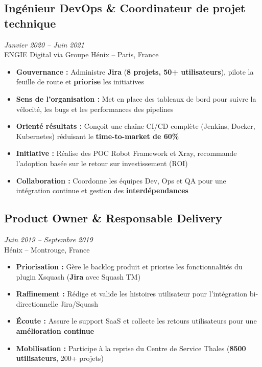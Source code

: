 \documentclass[11pt,a4paper]{article}
\newcommand{\highlight}[1]{\textcolor{primaryblue}{\textbf{#1}}}
\newcommand{\keypoint}[1]{\textbf{#1}}
\begin{document}
\subsection*{Ingénieur DevOps \& Coordinateur de projet technique} \hfill \textit{\color{mediumgray}Janvier 2020 -- Juin 2021}\\
ENGIE Digital via Groupe Hénix -- Paris, France
\begin{itemize}[leftmargin=22pt]
    \item \highlight{Gouvernance :} Administre \highlight{Jira} (\keypoint{8 projets, 50+ utilisateurs}), pilote la feuille de route et \highlight{priorise} les initiatives
    \item \highlight{Sens de l'organisation :} Met en place des tableaux de bord pour suivre la vélocité, les bugs et les performances des pipelines
    \item \highlight{Orienté résultats :} Conçoit une chaîne CI/CD complète (Jenkins, Docker, Kubernetes) réduisant le \keypoint{time-to-market de 60\%}
    \item \highlight{Initiative :} Réalise des POC Robot Framework et Xray, recommande l'adoption basée sur le retour sur investissement (ROI)
    \item \highlight{Collaboration :} Coordonne les équipes Dev, Ops et QA pour une intégration continue et gestion des \highlight{interdépendances}
\end{itemize}

\subsection*{Product Owner \& Responsable Delivery} \hfill \textit{\color{mediumgray}Juin 2019 -- Septembre 2019}\\
Hénix -- Montrouge, France
\begin{itemize}[leftmargin=22pt]
    \item \highlight{Priorisation :} Gère le backlog produit et priorise les fonctionnalités du plugin Xsquash (\highlight{Jira} avec Squash TM)
    \item \highlight{Raffinement :} Rédige et valide les histoires utilisateur pour l'intégration bi-directionnelle Jira/Squash
    \item \highlight{Écoute :} Assure le support SaaS et collecte les retours utilisateurs pour une \highlight{amélioration continue}
    \item \highlight{Mobilisation :} Participe à la reprise du Centre de Service Thales (\keypoint{8500 utilisateurs}, 200+ projets)
\end{itemize}
\end{document}
